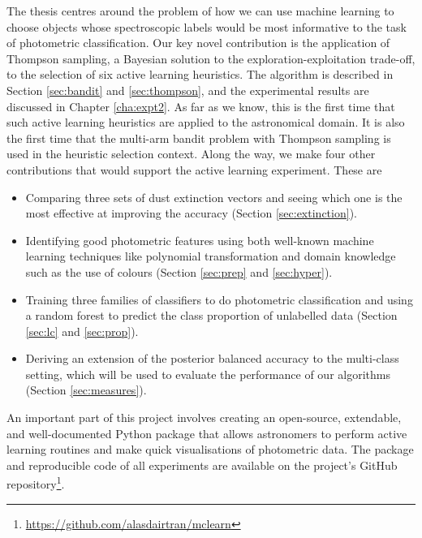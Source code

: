 The thesis centres around the problem of how we can use machine learning to choose objects whose
spectroscopic labels would be most informative to the task of photometric classification. Our key
novel contribution is the application of Thompson sampling, a Bayesian solution to the
exploration-exploitation trade-off, to the selection of six active learning heuristics. The
algorithm is described in Section \ref{sec:bandit} and \ref{sec:thompson}, and the experimental
results are discussed in Chapter \ref{cha:expt2}. As far as we know, this is the first time that
such active learning heuristics are applied to the astronomical domain. It is also the first time
that the multi-arm bandit problem with Thompson sampling is used in the heuristic selection
context. Along the way, we make four other contributions that would support the active learning
experiment. These are
	\begin{itemize}
		\item Comparing three sets of dust extinction vectors and seeing which one is the most
		effective at improving the accuracy (Section \ref{sec:extinction}).
		
		\item Identifying good photometric features using both well-known machine learning techniques
		like polynomial transformation and domain knowledge such as the use of colours (Section
		\ref{sec:prep} and \ref{sec:hyper}).
		
		\item Training three families of classifiers to do photometric classification and using
		a random forest to predict the class proportion of unlabelled data (Section \ref{sec:lc}
		and \ref{sec:prop}).
		
		\item Deriving an extension of the posterior balanced accuracy to the multi-class
		setting, which will be used to evaluate the performance of our algorithms (Section 
		\ref{sec:measures}).
	\end{itemize}
An important part of this project involves creating an open-source, extendable, and well-documented
Python package that allows astronomers to perform active learning routines and make quick
visualisations of photometric data. The package and reproducible code of all experiments are
available on the project's GitHub repository\footnote{
	\url{https://github.com/alasdairtran/mclearn}}.


